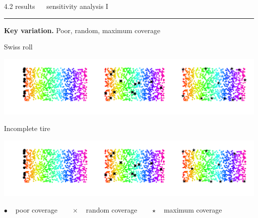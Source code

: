 \documentclass[11pt, compress, t, notes = noshow, xcolor = table, 
aspectratio = 1610]{beamer}
\begin{document}

\LARGE
\begin{frame}{\textcolor{gray!90}{4.2 results} ~~ sensitivity analysis I}
\normalsize
\vspace{-0.5cm}
\noindent \textcolor{gray!90}{\rule{\textwidth}{1pt}}
\smallskip

\textbf{Key variation.} Poor, random, maximum coverage

\vspace{0.3cm}

\begin{minipage}[c]{0.2\textwidth}
  Swiss roll
\end{minipage}%
\begin{minipage}[c]{0.8\textwidth}
  \includegraphics[trim = 40 20 0 0, clip, %
    width = \textwidth]{figures/sensitivity_landmarks_key_swiss}
\end{minipage}

\vspace{0.3cm}   

\begin{minipage}[c]{0.2\textwidth}
  Incomplete tire
\end{minipage}%
\begin{minipage}[c]{0.8\textwidth}
  \includegraphics[trim = 40 20 0 0, clip, %
    width = \textwidth]{figures/sensitivity_landmarks_key_tire}
\end{minipage}

\vfill

\scriptsize
$\bullet$ ~ poor coverage ~~~ $\bm{\times}$ ~ random coverage ~~~
$\star$ ~ maximum coverage

\end{frame}

\end{document}
